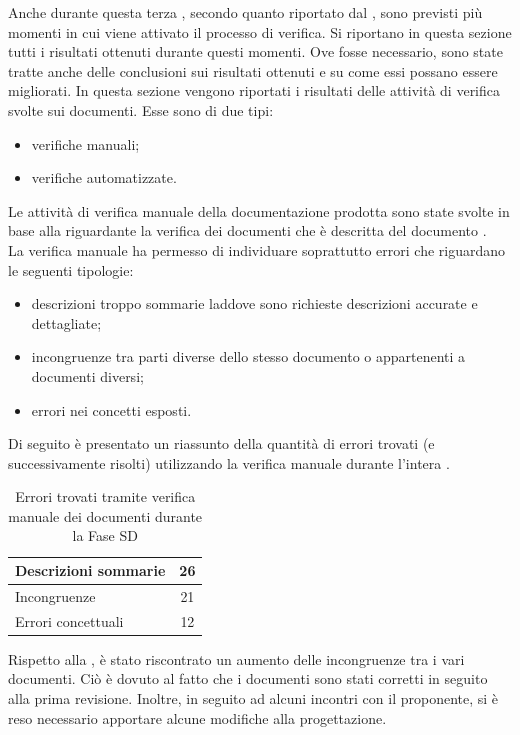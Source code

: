  \label{app:esitiSD}
Anche durante questa terza , secondo quanto riportato dal , sono previsti più momenti in cui viene attivato il processo di verifica. Si riportano in questa sezione tutti i risultati ottenuti durante questi momenti. Ove fosse necessario, sono state tratte anche delle conclusioni sui risultati ottenuti e su come essi possano essere migliorati.
			In questa sezione vengono riportati i risultati delle attività di verifica svolte sui documenti. Esse sono di due tipi:
			\begin{itemize}
				\item verifiche manuali;
				\item verifiche automatizzate.
			\end{itemize}
				Le attività di verifica manuale della documentazione prodotta sono state svolte in base alla  riguardante la verifica dei 
				documenti che è descritta del documento .\\
				La verifica manuale ha permesso di individuare soprattutto errori che riguardano le seguenti tipologie:
				\begin{itemize}
					\item descrizioni troppo sommarie laddove sono richieste descrizioni accurate e dettagliate;
					\item incongruenze tra parti diverse dello stesso documento o appartenenti a documenti diversi;
					\item errori nei concetti esposti.
				\end{itemize}
				Di seguito è presentato un riassunto della quantità di errori trovati (e successivamente risolti) utilizzando la verifica manuale durante l'intera .
				\begin{table}[H]
					\centering
					\begin{tabu}{| l | c |}
						\hline
						Descrizioni sommarie	&	26\\ \hline
						Incongruenze	&	21\\ \hline
						Errori concettuali	&	12\\ \hline
					\end{tabu}
					\caption{Errori trovati tramite verifica manuale dei documenti durante la Fase SD}
				\end{table}
				Rispetto alla , è stato riscontrato un aumento delle incongruenze tra i vari documenti. Ciò è dovuto al fatto che i documenti sono stati corretti in seguito alla prima revisione. Inoltre, in seguito ad alcuni incontri con il proponente, si è reso necessario apportare alcune modifiche alla progettazione.\\

